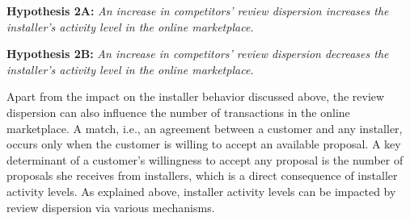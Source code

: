 \documentclass[mnsc,blindrev]{informs3}
\begin{document}
%
%
	
	
	\noindent\textbf{Hypothesis 2A:} \emph{An increase in competitors' review dispersion increases the installer's activity level in the online marketplace.}
	
	\noindent\textbf{Hypothesis 2B:} \emph{An increase in competitors' review dispersion decreases the installer's activity level in the online marketplace.}


Apart from the impact on the installer behavior discussed above, the review dispersion can also influence the number of transactions in the online marketplace.  A match, i.e., an agreement between a customer and any installer, occurs only when the customer is willing to accept an available proposal. A key determinant of a customer's willingness to accept any proposal is the number of proposals she receives from installers, which is a direct consequence of installer activity levels. As explained above, installer activity levels can be impacted by review dispersion via various mechanisms.
\end{document}
